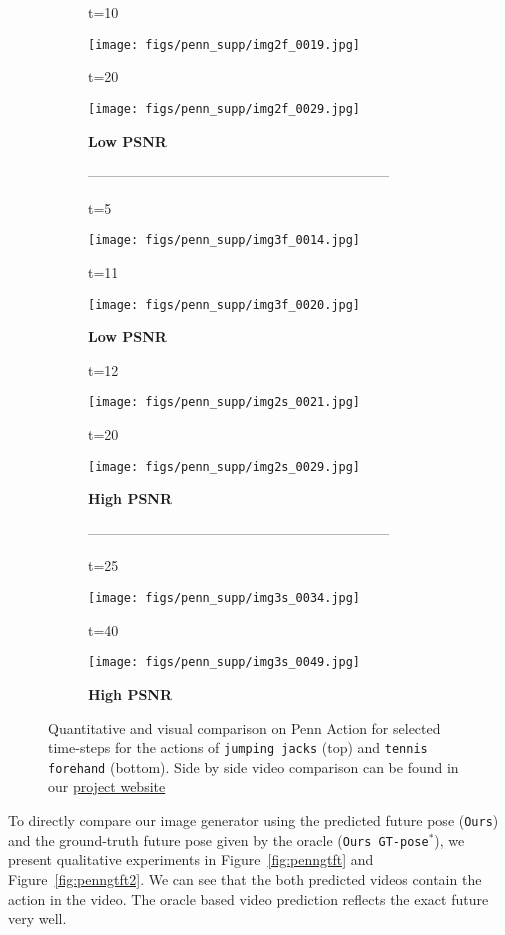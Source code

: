 \documentclass{article}
\begin{document}
\begin{appendix}
\clearpage
\begin{figure}[htb!]
    \centering
    \vspace{20pt}
    \begin{subfigure}{0.40\linewidth}
        \caption*{t=10}
        \vspace{-9pt}
	    \texttt{[image: figs/penn\_supp/img2f\_0019.jpg]}
  		\caption*{t=20}
        \vspace{-9pt}
  		\texttt{[image: figs/penn\_supp/img2f\_0029.jpg]}
  		\caption*{\textbf{Low PSNR}}
  		\caption*{-----------------------------------------------------------------}
  		\caption*{t=5}
        \vspace{-9pt}
	    \texttt{[image: figs/penn\_supp/img3f\_0014.jpg]}
  		\caption*{t=11}
        \vspace{-9pt}
  		\texttt{[image: figs/penn\_supp/img3f\_0020.jpg]}
  		\caption*{\textbf{Low PSNR}}
	\end{subfigure}
	\hspace{10pt}
    \begin{subfigure}{0.40\linewidth}
        \caption*{t=12}
        \vspace{-9pt}
	    \texttt{[image: figs/penn\_supp/img2s\_0021.jpg]}
  		\caption*{t=20}
        \vspace{-9pt}
  		\texttt{[image: figs/penn\_supp/img2s\_0029.jpg]}
  		\caption*{\textbf{High PSNR}}
  		\caption*{-----------------------------------------------------------------}
  		\caption*{t=25}
        \vspace{-9pt}
	    \texttt{[image: figs/penn\_supp/img3s\_0034.jpg]}
  		\caption*{t=40}
        \vspace{-9pt}
  		\texttt{[image: figs/penn\_supp/img3s\_0049.jpg]}
  		\caption*{\textbf{High PSNR}}
	\end{subfigure}
	\vspace{-.1cm}
    \caption{Quantitative and visual comparison on Penn Action for selected time-steps for the actions of \texttt{jumping jacks} (top) and \texttt{tennis forehand} (bottom). Side by side video comparison can be found in our \href{https://goo.gl/U7UOfy}{project website}}
\label{fig:pennbad2}
\vspace{-40pt}
\end{figure}

\clearpage
To directly compare our image generator using the predicted future pose (\texttt{Ours}) and the ground-truth future pose given by the oracle (\texttt{Ours GT-pose$^*$}), we present qualitative experiments in Figure~\ref{fig:penngtft} and Figure~\ref{fig:penngtft2}.
We can see that the both predicted videos contain the action in the video. The oracle based video prediction reflects the exact future very well.


\end{appendix}
\end{document}
